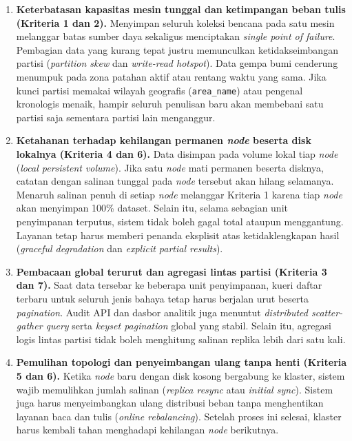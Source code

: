 \begin{enumerate}
  \item \textbf{Keterbatasan kapasitas mesin tunggal dan ketimpangan beban tulis (Kriteria 1 dan 2).}
  Menyimpan seluruh koleksi bencana pada satu mesin melanggar batas sumber daya sekaligus menciptakan \textit{single point of failure}. Pembagian data yang kurang tepat justru memunculkan ketidakseimbangan partisi (\textit{partition skew} dan \textit{write-read hotspot}). Data gempa bumi cenderung menumpuk pada zona patahan aktif atau rentang waktu yang sama. Jika kunci partisi memakai wilayah geografis (\texttt{area\_name}) atau pengenal kronologis menaik, hampir seluruh penulisan baru akan membebani satu partisi saja sementara partisi lain menganggur.

  \item \textbf{Ketahanan terhadap kehilangan permanen \textit{node} beserta disk lokalnya (Kriteria 4 dan 6).}
  Data disimpan pada volume lokal tiap \textit{node} (\textit{local persistent volume}). Jika satu \textit{node} mati permanen beserta disknya, catatan dengan salinan tunggal pada \textit{node} tersebut akan hilang selamanya. Menaruh salinan penuh di setiap \textit{node} melanggar Kriteria 1 karena tiap \textit{node} akan menyimpan 100\% dataset. Selain itu, selama sebagian unit penyimpanan terputus, sistem tidak boleh gagal total ataupun menggantung. Layanan tetap harus memberi penanda eksplisit atas ketidaklengkapan hasil (\textit{graceful degradation} dan \textit{explicit partial results}).

  \item \textbf{Pembacaan global terurut dan agregasi lintas partisi (Kriteria 3 dan 7).}
  Saat data tersebar ke beberapa unit penyimpanan, kueri daftar terbaru untuk seluruh jenis bahaya tetap harus berjalan urut beserta \textit{pagination}. Audit API dan dasbor analitik juga menuntut \textit{distributed scatter-gather query} serta \textit{keyset pagination} global yang stabil. Selain itu, agregasi logis lintas partisi tidak boleh menghitung salinan replika lebih dari satu kali.

  \item \textbf{Pemulihan topologi dan penyeimbangan ulang tanpa henti (Kriteria 5 dan 6).}
  Ketika \textit{node} baru dengan disk kosong bergabung ke klaster, sistem wajib memulihkan jumlah salinan (\textit{replica resync} atau \textit{initial sync}). Sistem juga harus menyeimbangkan ulang distribusi beban tanpa menghentikan layanan baca dan tulis (\textit{online rebalancing}). Setelah proses ini selesai, klaster harus kembali tahan menghadapi kehilangan \textit{node} berikutnya.
\end{enumerate}

